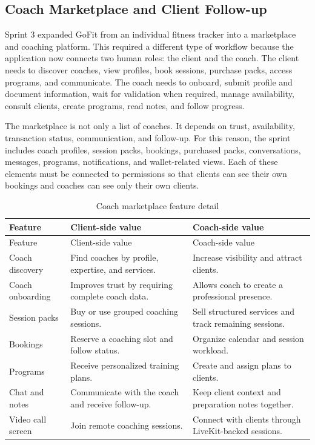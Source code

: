 \documentclass[12pt,a4paper,openany]{report}
\begin{document}
\subsection{Coach Marketplace and Client Follow-up}

Sprint 3 expanded GoFit from an individual fitness tracker into a marketplace and coaching platform. This required a different type of workflow because the application now connects two human roles: the client and the coach. The client needs to discover coaches, view profiles, book sessions, purchase packs, access programs, and communicate. The coach needs to onboard, submit profile and document information, wait for validation when required, manage availability, consult clients, create programs, read notes, and follow progress.


The marketplace is not only a list of coaches. It depends on trust, availability, transaction status, communication, and follow-up. For this reason, the sprint includes coach profiles, session packs, bookings, purchased packs, conversations, messages, programs, notifications, and wallet-related views. Each of these elements must be connected to permissions so that clients can see their own bookings and coaches can see only their own clients.


\begingroup
\footnotesize
\setlength{\tabcolsep}{3pt}
\renewcommand{\arraystretch}{1.20}
\setlength{\LTpre}{5pt}
\setlength{\LTpost}{10pt}
\begin{longtable}{|L{3.67cm}|L{5.29cm}|L{5.73cm}|}
\caption{Coach marketplace feature detail}\label{tab:pdf-76-34} \\
\hline
{}
Feature & Client-side value & Coach-side value \\ \hline
\endfirsthead
\hline
{}
Feature & Client-side value & Coach-side value \\ \hline
\endhead
Coach discovery & Find coaches by profile, expertise, and services. & Increase visibility and attract clients. \\ \hline
Coach onboarding & Improves trust by requiring complete coach data. & Allows coach to create a professional presence. \\ \hline
Session packs & Buy or use grouped coaching sessions. & Sell structured services and track remaining sessions. \\ \hline
Bookings & Reserve a coaching slot and follow status. & Organize calendar and session workload. \\ \hline
Programs & Receive personalized training plans. & Create and assign plans to clients. \\ \hline
Chat and notes & Communicate with the coach and receive follow-up. & Keep client context and preparation notes together. \\ \hline
Video call screen & Join remote coaching sessions. & Connect with clients through LiveKit-backed sessions. \\ \hline
\end{longtable}
\endgroup
\end{document}
